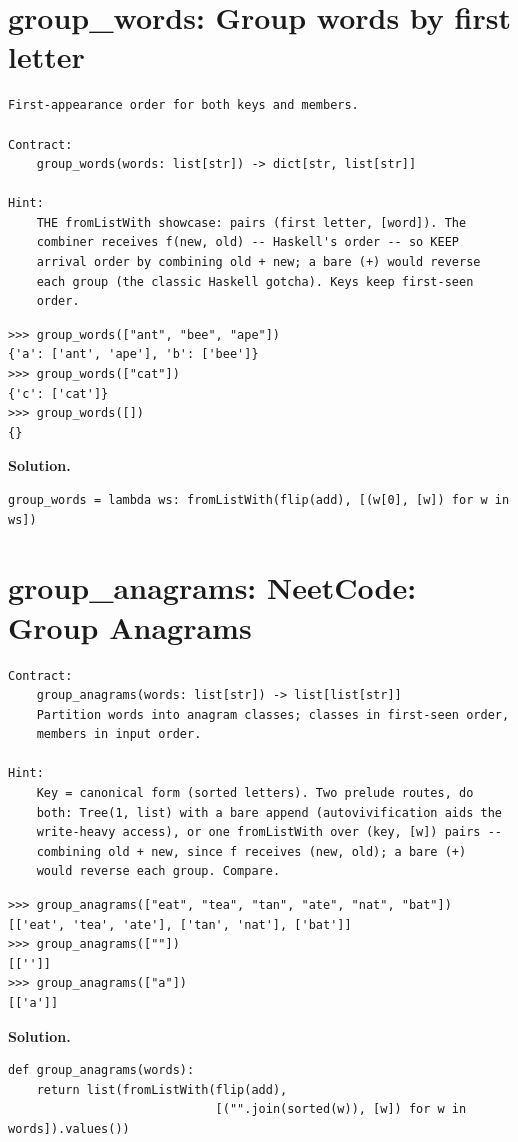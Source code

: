 \documentclass[10pt,letterpaper]{book}
\begin{document}
\section{group\_words: Group words by first letter}
\begin{lstlisting}[style=ex]
First-appearance order for both keys and members.

Contract:
    group_words(words: list[str]) -> dict[str, list[str]]

Hint:
    THE fromListWith showcase: pairs (first letter, [word]). The
    combiner receives f(new, old) -- Haskell's order -- so KEEP
    arrival order by combining old + new; a bare (+) would reverse
    each group (the classic Haskell gotcha). Keys keep first-seen
    order.
\end{lstlisting}
\begin{lstlisting}[style=ex]
>>> group_words(["ant", "bee", "ape"])
{'a': ['ant', 'ape'], 'b': ['bee']}
>>> group_words(["cat"])
{'c': ['cat']}
>>> group_words([])
{}
\end{lstlisting}
\noindent\textbf{Solution.}
\begin{lstlisting}[style=code]
group_words = lambda ws: fromListWith(flip(add), [(w[0], [w]) for w in ws])
\end{lstlisting}

\section{group\_anagrams: NeetCode: Group Anagrams}
\begin{lstlisting}[style=ex]
Contract:
    group_anagrams(words: list[str]) -> list[list[str]]
    Partition words into anagram classes; classes in first-seen order,
    members in input order.

Hint:
    Key = canonical form (sorted letters). Two prelude routes, do
    both: Tree(1, list) with a bare append (autovivification aids the
    write-heavy access), or one fromListWith over (key, [w]) pairs --
    combining old + new, since f receives (new, old); a bare (+)
    would reverse each group. Compare.
\end{lstlisting}
\begin{lstlisting}[style=ex]
>>> group_anagrams(["eat", "tea", "tan", "ate", "nat", "bat"])
[['eat', 'tea', 'ate'], ['tan', 'nat'], ['bat']]
>>> group_anagrams([""])
[['']]
>>> group_anagrams(["a"])
[['a']]
\end{lstlisting}
\noindent\textbf{Solution.}
\begin{lstlisting}[style=code]
def group_anagrams(words):
    return list(fromListWith(flip(add),
                             [("".join(sorted(w)), [w]) for w in words]).values())
\end{lstlisting}
\end{document}
